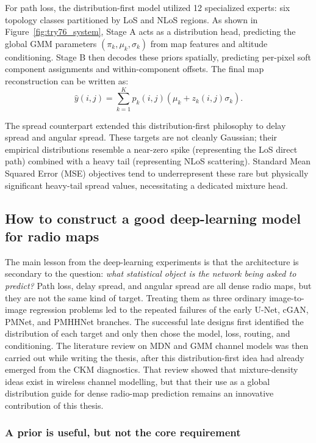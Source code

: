 For path loss, the distribution-first model utilized 12 specialized experts: six topology classes partitioned by LoS
and NLoS regions. As shown in Figure~\ref{fig:try76_system}, Stage A acts as a distribution head, predicting the global GMM parameters
$(\pi_k,\mu_k,\sigma_k)$ from map features and altitude conditioning.
Stage B then decodes these priors spatially, predicting per-pixel soft component assignments and within-component
offsets. The final map reconstruction can be written as:
\begin{equation}
  \hat y(i,j)
  =
  \sum_{k=1}^{K} p_k(i,j)
  \left(\mu_k + z_k(i,j)\sigma_k\right).
  \label{eq:gmm_reconstruction}
\end{equation}

The spread counterpart extended this distribution-first philosophy to delay spread and angular spread. These targets
are not cleanly Gaussian; their empirical distributions resemble a near-zero spike (representing the LoS direct path) combined with a
heavy tail (representing NLoS scattering). Standard Mean Squared Error (MSE) objectives tend to underrepresent these rare
but physically significant heavy-tail spread values, necessitating a dedicated mixture head.

\subsection{How to construct a good deep-learning model for radio maps}
\label{sec:good_dl_model_design}

The main lesson from the deep-learning experiments is that the architecture is
secondary to the question: \emph{what statistical object is the network being
asked to predict?} Path loss, delay spread, and angular spread are all dense
radio maps, but they are not the same kind of target. Treating them as three
ordinary image-to-image regression problems led to the repeated failures of
the early U-Net, cGAN, PMNet, and PMHHNet branches. The successful late
designs first identified the distribution of each target and only then chose
the model, loss, routing, and conditioning.  The literature review on MDN and
GMM channel models was then carried out while writing the thesis, after this
distribution-first idea had already emerged from the CKM diagnostics.  That
review showed that mixture-density ideas exist in wireless channel modelling,
but that their use as a global distribution guide for dense radio-map
prediction remains an innovative contribution of this thesis.

\subsubsection{A prior is useful, but not the core requirement}

